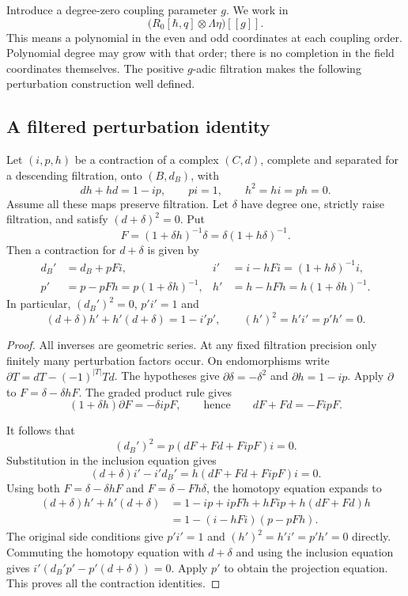 Introduce a degree-zero coupling parameter $g$. We work in
\[
 \bigl(R_0[\hbar,q]\otimes\Lambda\eta\bigr)[[g]].
\]
This means a polynomial in the even and odd coordinates at
each coupling order. Polynomial degree may grow with that order;
there is no completion in the field coordinates themselves.
The positive $g$-adic filtration makes the following perturbation
construction well defined.

\subsection{A filtered perturbation identity}

\begin{lemma}\label{lem:vol2-filtered-perturbation}
Let $(i,p,h)$ be a contraction of a complex $(C,d)$, complete
and separated for a descending filtration, onto $(B,d_B)$, with
\[
 dh+hd=1-ip,\qquad pi=1,\qquad h^2=hi=ph=0.
\]
Assume all these maps preserve filtration. Let $\delta$ have
degree one, strictly raise filtration, and satisfy
$(d+\delta)^2=0$. Put
\[
 F=(1+\delta h)^{-1}\delta=\delta(1+h\delta)^{-1}.
\]
Then a contraction for $d+\delta$ is given by
\begin{equation}\label{eq:vol2-perturbation-formulas}
 \begin{aligned}
 d_B'&=d_B+pFi,&
 i'&=i-hFi=(1+h\delta)^{-1}i,\\
 p'&=p-pFh=p(1+\delta h)^{-1},&
 h'&=h-hFh=h(1+\delta h)^{-1}.
 \end{aligned}
\end{equation}
In particular, $(d_B')^2=0$, $p'i'=1$ and
\[
 (d+\delta)h'+h'(d+\delta)=1-i'p',\qquad
 (h')^2=h'i'=p'h'=0.
\]
\end{lemma}
\begin{proof}
All inverses are geometric series. At any fixed filtration
precision only finitely many perturbation factors occur.
On endomorphisms write
$\partial T=dT-(-1)^{|T|}Td$.
The hypotheses give $\partial\delta=-\delta^2$ and
$\partial h=1-ip$. Apply $\partial$ to
$F=\delta-\delta hF$. The graded product rule gives
\[
 (1+\delta h)\partial F=-\delta ipF,
 \qquad\text{hence}\qquad
 dF+Fd=-FipF.
\]

It follows that
\[
 (d_B')^2=p(dF+Fd+FipF)i=0.
\]
Substitution in the inclusion equation gives
\[
 (d+\delta)i'-i'd_B'=h(dF+Fd+FipF)i=0.
\]
Using both $F=\delta-\delta hF$ and
$F=\delta-Fh\delta$, the homotopy equation expands to
\begin{align*}
 (d+\delta)h'+h'(d+\delta)
 &=1-ip+ipFh+hFip+h(dF+Fd)h\\
 &=1-(i-hFi)(p-pFh).
\end{align*}
The original side conditions give $p'i'=1$ and
$(h')^2=h'i'=p'h'=0$ directly. Commuting the homotopy
equation with $d+\delta$ and using the inclusion equation
gives $i'(d_B'p'-p'(d+\delta))=0$. Apply $p'$ to obtain
the projection equation. This proves all the contraction
identities.
\end{proof}

